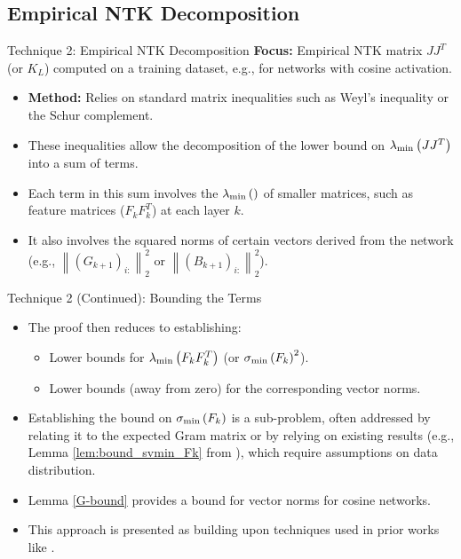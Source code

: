 \documentclass{beamer}
\newcommand{\norm}[1]{\left\lVert#1\right\rVert} %
\newcommand{\svmin}[1]{\sigma_{\rm min}\left(#1\right)} %
\newcommand{\evmin}[1]{\lambda_{\rm min}\left(#1\right)} %
\begin{document}
\subsection{Empirical NTK Decomposition}
\begin{frame}{Technique 2: Empirical NTK Decomposition}
  \textbf{Focus:} Empirical NTK matrix $JJ^T$ (or $K_L$) computed on a training dataset, e.g., for networks with cosine activation.
  \begin{itemize}[<+->]
    \item \textbf{Method:} Relies on standard matrix inequalities such as Weyl's inequality or the Schur complement.
    \item These inequalities allow the decomposition of the lower bound on $\evmin{JJ^T}$ into a sum of terms.
    \item Each term in this sum involves the $\evmin{}$ of smaller matrices, such as feature matrices ($F_kF_k^T$) at each layer $k$.
    \item It also involves the squared norms of certain vectors derived from the network (e.g., $\norm{(G_{k+1})_{i:}}_2^2$ or $\norm{(B_{k+1})_{i:}}_2^2$).
  \end{itemize}
\end{frame}

\begin{frame}{Technique 2 (Continued): Bounding the Terms}
  \begin{itemize}[<+->]
    \item The proof then reduces to establishing:
    \begin{itemize}
        \item Lower bounds for $\evmin{F_kF_k^T}$ (or $\svmin{F_k}^2$).
        \item Lower bounds (away from zero) for the corresponding vector norms.
    \end{itemize}
    \item Establishing the bound on $\svmin{F_k}$ is a sub-problem, often addressed by relating it to the expected Gram matrix or by relying on existing results (e.g., Lemma \ref{lem:bound_svmin_Fk} from \cite{QuynhNTK2021}), which require assumptions on data distribution.
    \item Lemma \ref{G-bound} provides a bound for vector norms for cosine networks.
    \item This approach is presented as building upon techniques used in prior works like \cite{nguyen2021tight}.
  \end{itemize}
\end{frame}
\end{document}
